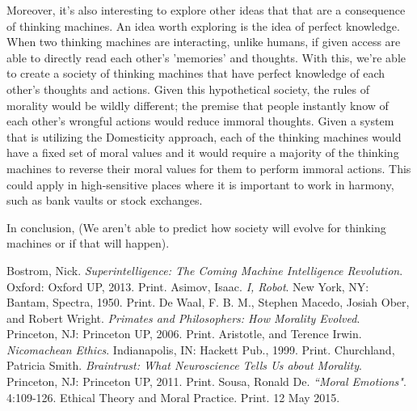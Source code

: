 \documentclass[11pt, oneside]{article}
\begin{document}
\par Moreover, it's also interesting to explore other ideas that that are a consequence of thinking machines. An idea worth exploring is the idea of perfect knowledge. When two thinking machines are interacting, unlike humans, if given access are able to directly read each other's 'memories' and thoughts. With this, we're able to create a society of thinking machines that have perfect knowledge of each other's thoughts and actions.
Given this hypothetical society, the rules of morality would be wildly different; the premise that people instantly know of each other's wrongful actions would reduce immoral thoughts. Given a system that is utilizing the Domesticity approach, each of the thinking machines would have a fixed set of moral values and it would require a majority of the thinking machines to reverse their moral values for them to perform immoral actions. This could apply in high-sensitive places where it is important to work in harmony, such as bank vaults or stock exchanges.
 
\par In conclusion, (We aren't able to predict how society will evolve for thinking machines or if that will happen).

\begin{thebibliography}{9}
  Bostrom, Nick. 
  \emph{Superintelligence: The Coming Machine Intelligence Revolution}.
  Oxford: Oxford UP, 2013.
  Print.
  Asimov, Isaac.
  \emph{I, Robot}.
  New York, NY: Bantam, Spectra, 1950.
  Print.
  De Waal, F. B. M., Stephen Macedo, Josiah Ober, and Robert Wright.
  \emph{Primates and Philosophers: How Morality Evolved}.
  Princeton, NJ: Princeton UP, 2006.
  Print.
  Aristotle, and Terence Irwin.
  \emph{Nicomachean Ethics}.
  Indianapolis, IN: Hackett Pub., 1999.
  Print.
  Churchland, Patricia Smith.
  \emph{Braintrust: What Neuroscience Tells Us about Morality}.
  Princeton, NJ: Princeton UP, 2011. 
  Print.
  Sousa, Ronald De. 
  \emph{``Moral Emotions"}. 
  4:109-126. Ethical Theory and Moral Practice.
  Print. 12 May 2015.
\end{thebibliography}
\end{document}
